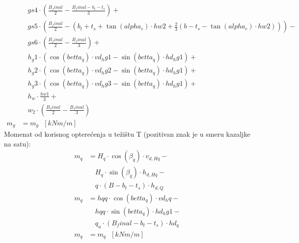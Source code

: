 \documentclass[a4paper, 11pt]{article}
\begin{document}
\begin{align*}
   &\quad gs4 \cdot \left( \frac{B_final}{2} - \frac{B_final - b_t - t_s}{3} \right) + \\
   &\quad gs5 \cdot \left( \frac{B_final}{2} - \left(b_t + t_s + \tan(alpha_c) \cdot hw2 + \frac{2}{3} \left(b - t_s - \tan(alpha_c) \cdot hw2 \right)\right) \right) - \\
   &\quad gs6 \cdot \left( \frac{B_final}{2} - \frac{B_final}{3} \right) + \\
   &\quad h_g1 \cdot  \left( \cos (betta_q) \cdot vd_hg1 -  \sin (betta_q) \cdot hd_hg1 \right) + \\
   &\quad h_g2 \cdot \left( \cos (betta_q) \cdot vd_hg2 -  \sin (betta_q) \cdot hd_hg1 \right) +  \\
   &\quad h_g3 \cdot \left( \cos (betta_q) \cdot vd_hg3 -  \sin (betta_q) \cdot hd_hg1 \right) +  \\
   &\quad h_w \cdot \frac{hw1}{3} + \\
   &\quad w_2 \cdot \left( \frac{B_final}{2} - \frac{B_final}{3} \right) \\
m_{g} &= m_g \text{ } [kNm/m]
\end{align*}
Momenat od korisnog optere\'cenja u te\v{z}i\v{s}tu T (pozitivan znak je u smeru kazaljke na satu):
\begin{align*}
m_{q} &= H_{q} \cdot \cos (\beta_{q}) \cdot v_{d,Hq} - \\
	  &\quad H_{q} \cdot \sin (\beta_{q}) \cdot h_{d,Hq} - \\	
	  &\quad q \cdot (B - b_{t} - t_{s}) \cdot h_{d,Q} \\
m_{q} &= hqq \cdot \cos (betta_q) \cdot vd_hq - \\
	  &\quad hqq \cdot \sin (betta_q) \cdot hd_hg1 - \\	
	  &\quad q_u \cdot (B_final - b_t - t_s) \cdot hd_q \\
m_{q} &= m_q \text{ } [kNm/m]
\end{align*}
\end{document}
